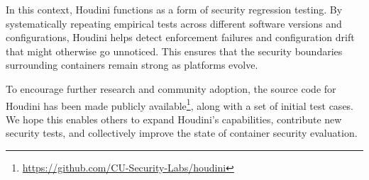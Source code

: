 \documentclass[12pt]{report}
\begin{document}
\begin{doublespace}
In this context, Houdini functions as a form of security regression testing. By systematically repeating empirical tests across different software versions and configurations, Houdini helps detect enforcement failures and configuration drift that might otherwise go unnoticed. This ensures that the security boundaries surrounding containers remain strong as platforms evolve.

To encourage further research and community adoption, the source code for Houdini has been made publicly available\footnote{\url{https://github.com/CU-Security-Labs/houdini}}, along with a set of initial test cases. We hope this enables others to expand Houdini’s capabilities, contribute new security tests, and collectively improve the state of container security evaluation.

\end{doublespace} \fontsize{12pt}{14pt} \selectfont
\end{document}
